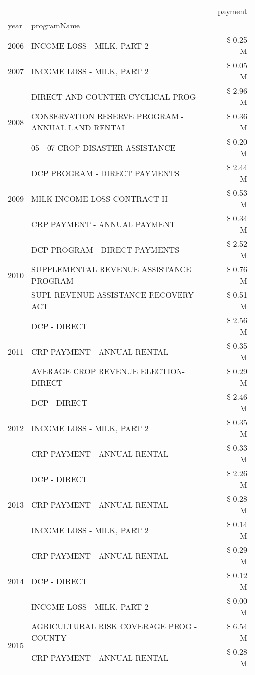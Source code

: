 \begin{tabular}{llr}
\toprule
 &  & payment \\
year & programName &  \\
\midrule
2006 & INCOME LOSS - MILK, PART 2 & \$ 0.25 M \\
\cline{1-3}
2007 & INCOME LOSS - MILK, PART 2 & \$ 0.05 M \\
\cline{1-3}
\multirow[t]{3}{*}{2008} & DIRECT AND COUNTER CYCLICAL PROG & \$ 2.96 M \\
 & CONSERVATION RESERVE PROGRAM - ANNUAL LAND RENTAL & \$ 0.36 M \\
 & 05 - 07 CROP DISASTER ASSISTANCE & \$ 0.20 M \\
\cline{1-3}
\multirow[t]{3}{*}{2009} & DCP PROGRAM - DIRECT PAYMENTS & \$ 2.44 M \\
 & MILK INCOME LOSS CONTRACT II & \$ 0.53 M \\
 & CRP PAYMENT - ANNUAL PAYMENT & \$ 0.34 M \\
\cline{1-3}
\multirow[t]{3}{*}{2010} & DCP PROGRAM - DIRECT PAYMENTS & \$ 2.52 M \\
 & SUPPLEMENTAL REVENUE ASSISTANCE PROGRAM & \$ 0.76 M \\
 & SUPL REVENUE ASSISTANCE RECOVERY ACT & \$ 0.51 M \\
\cline{1-3}
\multirow[t]{3}{*}{2011} & DCP - DIRECT & \$ 2.56 M \\
 & CRP PAYMENT - ANNUAL RENTAL & \$ 0.35 M \\
 & AVERAGE CROP REVENUE ELECTION-DIRECT & \$ 0.29 M \\
\cline{1-3}
\multirow[t]{3}{*}{2012} & DCP - DIRECT & \$ 2.46 M \\
 & INCOME LOSS - MILK, PART 2 & \$ 0.35 M \\
 & CRP PAYMENT - ANNUAL RENTAL & \$ 0.33 M \\
\cline{1-3}
\multirow[t]{3}{*}{2013} & DCP - DIRECT & \$ 2.26 M \\
 & CRP PAYMENT - ANNUAL RENTAL & \$ 0.28 M \\
 & INCOME LOSS - MILK, PART 2 & \$ 0.14 M \\
\cline{1-3}
\multirow[t]{3}{*}{2014} & CRP PAYMENT - ANNUAL RENTAL & \$ 0.29 M \\
 & DCP - DIRECT & \$ 0.12 M \\
 & INCOME LOSS - MILK, PART 2 & \$ 0.00 M \\
\cline{1-3}
\multirow[t]{2}{*}{2015} & AGRICULTURAL RISK COVERAGE PROG - COUNTY & \$ 6.54 M \\
 & CRP PAYMENT - ANNUAL RENTAL & \$ 0.28 M \\

\end{tabular}
